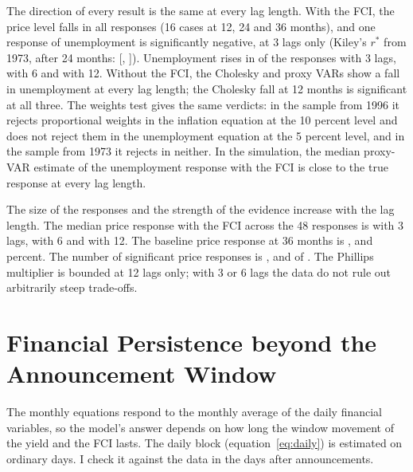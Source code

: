 \documentclass[11pt]{article}
\newcommand{\rs}{r^{*}}
\begin{document}
\begin{appendices}
The direction of every result is the same at every lag length. With the FCI, the price level falls in all  responses (16 cases at 12, 24 and 36 months), and one response of unemployment is significantly negative, at 3 lags only (Kiley's $\rs$ from 1973, after 24 months:  [, ]). Unemployment rises in  of the  responses with 3 lags,  with 6 and  with 12. Without the FCI, the Cholesky and proxy VARs show a fall in unemployment at every lag length; the Cholesky fall at 12 months is significant at all three. The weights test gives the same verdicts: in the sample from 1996 it rejects proportional weights in the inflation equation at the 10 percent level and does not reject them in the unemployment equation at the 5 percent level, and in the sample from 1973 it rejects in neither. In the simulation, the median proxy-VAR estimate of the unemployment response with the FCI is close to the true response at every lag length.

The size of the responses and the strength of the evidence increase with the lag length. The median price response with the FCI across the 48 responses is  with 3 lags,  with 6 and  with 12. The baseline price response at 36 months is ,  and  percent. The number of significant price responses is ,  and  of . The Phillips multiplier is bounded at 12 lags only; with 3 or 6 lags the data do not rule out arbitrarily steep trade-offs.




\FloatBarrier
\section{Financial Persistence beyond the Announcement Window}\label{app:persist}
The monthly equations respond to the monthly average of the daily financial variables, so the model's answer depends on how long the window movement of the yield and the FCI lasts. The daily block (equation~\eqref{eq:daily}) is estimated on ordinary days. I check it against the data in the days after announcements.


\end{appendices}
\end{document}
